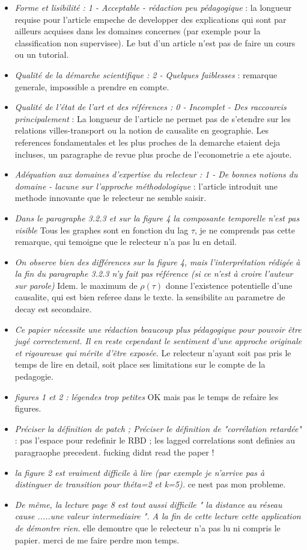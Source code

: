 \documentclass[11pt,a4paper,sans]{moderncv}        %
\begin{document}
\begin{itemize}
	\item \textit{Forme et lisibilité :  1 - Acceptable - rédaction peu pédagogique} : la longueur requise pour l'article empeche de developper des explications qui sont par ailleurs acquises dans les domaines concernes (par exemple pour la classification non supervisee). Le but d'un article n'est pas de faire un cours ou un tutorial.
	\item \textit{Qualité de la démarche scientifique :  2 - Quelques faiblesses} : remarque generale, impossible a prendre en compte.
	\item \textit{Qualité de l'état de l'art et des références :  0 - Incomplet - Des raccourcis principalement} : La longueur de l'article ne permet pas de s'etendre sur les relations villes-transport ou la notion de causalite en geographie. Les references fondamentales et les plus proches de la demarche etaient deja incluses, un paragraphe de revue plus proche de l'econometrie a ete ajoute.
	\item \textit{Adéquation aux domaines d'expertise du relecteur :  1 - De bonnes notions du domaine - lacune sur l'approche méthodologique} : l'article introduit une methode innovante que le relecteur ne semble saisir.
	\item \textit{Dans le paragraphe 3.2.3   et sur la figure 4 la composante temporelle n'est pas visible} Tous les graphes sont en fonction du lag $\tau$, je ne comprends pas cette remarque, qui temoigne que le relecteur n'a pas lu en detail.
	\item \textit{On observe bien des différences sur la figure 4, mais l'interprétation rédigée à la fin du paragraphe 3.2.3 n'y fait pas référence (si ce n’est à croire l’auteur sur parole)} Idem. le maximum de $\rho(\tau)$ donne l'existence potentielle d'une causalite, qui est bien referee dans le texte. la sensibilite au parametre de decay est secondaire.
	\item \textit{Ce papier nécessite une rédaction beaucoup plus pédagogique pour pouvoir être jugé correctement. Il en reste cependant le sentiment d'une approche originale et rigoureuse qui mérite d'être exposée.} Le relecteur n'ayant soit pas pris le temps de lire en detail, soit place ses limitations sur le compte de la pedagogie.
	\item \textit{figures 1 et 2  : légendes trop petites} OK mais pas le temps de refaire les figures.
	\item \textit{Préciser la définition de patch ; Préciser le définition de "corrélation retardée"} : pas l'espace pour redefinir le RBD ; les lagged correlations sont definies au paragraophe precedent. fucking didnt read the paper !
	\item \textit{la figure 2 est vraiment difficile à lire (par exemple je n'arrive pas à distinguer de transition pour théta=2 et k=5).} ce nest pas mon probleme.
	\item \textit{De même, la lecture page 8 est tout aussi difficile " la distance au réseau cause .....une valeur intermediaire ". A la fin de cette lecture cette application de démontre rien.} elle demontre que le relecteur n'a pas lu ni compris le papier. merci de me faire perdre mon temps.
\end{itemize}
\end{document}
